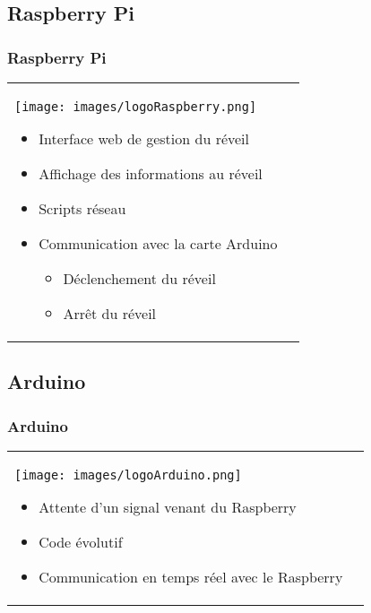 \documentclass[handout]{beamer}
\begin{document}
	\subsection{Raspberry Pi}
		\begin{frame}
		\frametitle{Raspberry Pi}

		\begin{tabular}{l l}
			\begin{minipage}{0.2\textwidth}
				\begin{center}
					\texttt{[image: images/logoRaspberry.png]}
				\end{center}
			\end{minipage}

			\begin{minipage}{0.8\textwidth}
				\begin{itemize}
					\item Interface web de gestion du réveil
					\item Affichage des informations au réveil
					\item Scripts réseau
					\item Communication avec la carte Arduino
					\begin{itemize}
						\item Déclenchement du réveil 
						\item Arrêt du réveil 
					\end{itemize}
				\end{itemize}
			\end{minipage}
			
		\end{tabular}
		\end{frame}

	\subsection{Arduino}
		\begin{frame}
		\frametitle{Arduino}

		\begin{tabular}{l l}
			\begin{minipage}{0.2\textwidth}
				\begin{center}
					\texttt{[image: images/logoArduino.png]}
				\end{center}
			\end{minipage}

			\begin{minipage}{0.8\textwidth}
				\begin{itemize}
					\item Attente d'un signal venant du Raspberry
					\item Code évolutif
					\item Communication en temps réel avec le Raspberry
				\end{itemize}
			\end{minipage}
			
		\end{tabular}
		\end{frame}
\end{document}
